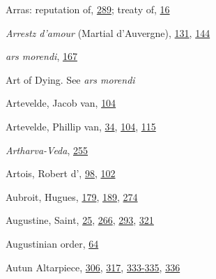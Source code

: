 Arras: reputation of,
\protect\hyperlink{18_Chapter_Eleven__THE_FORMS_OF_THO.xhtmlux5cux23page_289}{289};
treaty of,
\protect\hyperlink{08_Chapter_One__THE_PASSIONATE_INTE.xhtmlux5cux23page_16}{16}

\emph{Arrestz d'amour} (Martial d'Auvergne),
\protect\hyperlink{11_Chapter_Four__THE_FORMS_OF_LOVE.xhtmlux5cux23page_131}{131},
\protect\hyperlink{11_Chapter_Four__THE_FORMS_OF_LOVE.xhtmlux5cux23page_144}{144}

\emph{ars morendi},
\protect\hyperlink{12_Chapter_Five__THE_VISION_OF_DEAT.xhtmlux5cux23page_167}{167}

Art of Dying. See \emph{ars morendi}

Artevelde, Jacob van,
\protect\hyperlink{10_Chapter_Three__THE_HEROIC_DREAM.xhtmlux5cux23page_104}{104}

Artevelde, Phillip van,
\protect\hyperlink{09_Chapter_Two__THE_CRAVING_FOR_A_M.xhtmlux5cux23page_34}{34},
\protect\hyperlink{10_Chapter_Three__THE_HEROIC_DREAM.xhtmlux5cux23page_104}{104},
\protect\hyperlink{10_Chapter_Three__THE_HEROIC_DREAM.xhtmlux5cux23page_115}{115}

\emph{Artharva-Veda},
\protect\hyperlink{17_Chapter_Ten__THE_FAILURE_OF_IMAG.xhtmlux5cux23page_255}{255}

Artois, Robert d',
\protect\hyperlink{10_Chapter_Three__THE_HEROIC_DREAM.xhtmlux5cux23page_98}{98},
\protect\hyperlink{10_Chapter_Three__THE_HEROIC_DREAM.xhtmlux5cux23page_102}{102}

\protect\hypertarget{25_INDEX.xhtmlux5cux23page_452}{}{}Aubroit, Hugues,
\protect\hyperlink{13_Chapter_Six__THE_DEPICTION_OF_TH.xhtmlux5cux23page_179}{179},
\protect\hyperlink{13_Chapter_Six__THE_DEPICTION_OF_TH.xhtmlux5cux23page_189}{189},
\protect\hyperlink{18_Chapter_Eleven__THE_FORMS_OF_THO.xhtmlux5cux23page_274}{274}

Augustine, Saint,
\protect\hyperlink{08_Chapter_One__THE_PASSIONATE_INTE.xhtmlux5cux23page_25}{25},
\protect\hyperlink{17_Chapter_Ten__THE_FAILURE_OF_IMAG.xhtmlux5cux23page_266}{266},
\protect\hyperlink{18_Chapter_Eleven__THE_FORMS_OF_THO.xhtmlux5cux23page_293}{293},
\protect\hyperlink{20_ILLUSTRATIONS_FOLLOW_PAGE.xhtmlux5cux23page_321}{321}

Augustinian order,
\protect\hyperlink{10_Chapter_Three__THE_HEROIC_DREAM.xhtmlux5cux23page_64}{64}

Autun Altarpiece,
\protect\hyperlink{20_ILLUSTRATIONS_FOLLOW_PAGE.xhtmlux5cux23page_306}{306},
\protect\hyperlink{20_ILLUSTRATIONS_FOLLOW_PAGE.xhtmlux5cux23page_317}{317},
\protect\hyperlink{21_Chapter_Thirteen__IMAGE_AND_WORD.xhtmlux5cux23page_333}{333-}\protect\hyperlink{21_Chapter_Thirteen__IMAGE_AND_WORD.xhtmlux5cux23page_335}{335},
\protect\hyperlink{21_Chapter_Thirteen__IMAGE_AND_WORD.xhtmlux5cux23page_336}{336}

